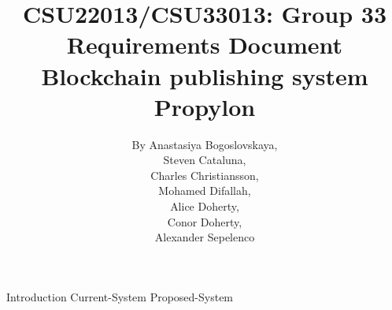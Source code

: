 \documentclass{article}
\title{
	{CSU22013/CSU33013: Group 33}\\
	{Requirements Document}\\
	{Blockchain publishing system}\\
	{\large Propylon}
}
\author{
	{By Anastasiya Bogoslovskaya,}\\
	{Steven Cataluna,} \\
	{Charles Christiansson,} \\
    {Mohamed Difallah,} \\
	{Alice Doherty,} \\
	{Conor Doherty,} \\
	{Alexander Sepelenco}
}
\date{} %
\begin{document}

\maketitle %
\tableofcontents %

{Introduction} 
{Current-System}
{Proposed-System}
\end{document}
